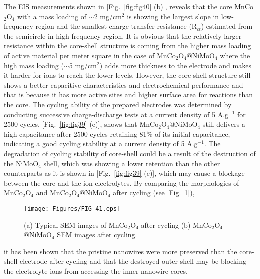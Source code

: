 \documentclass[reprint,amsmath,amssymb,aps,floatfix,
]{revtex4-2}
\begin{document}
The EIS measurements shown in [Fig.~\ref{fig:fig40} (b)], reveals that the core MnCo$_2$O$_4$ with a mass loading of $\sim$2 mg/cm$^2$ is showing the largest slope in low-frequency region and the smallest charge transfer resistance (R$_{ct}$) estimated from the semicircle in high-frequency region. It is obvious that the relatively larger resistance within the core-shell structure is coming from the higher mass loading of active material per meter square in the case of MnCo$_2$O$_4$@NiMoO$_4$ where the high mass loading ($\sim$5 mg/cm$^2$) adds more thickness to the electrode and makes it harder for ions to reach the lower levels. However, the core-shell structure still shows a better capacitive characteristics and electrochemical performance and that is because it has more active sites and higher surface area for reactions than the core. The cycling ability of the prepared electrodes was determined by conducting successive charge-discharge tests at a current density of 5 A.g$^{-1}$ for 2500 cycles. [Fig.~\ref{fig:fig39} (e)], shows that MnCo$_2$O$_4$@NiMoO$_4$ still delivers a high capacitance after 2500 cycles retaining 81\% of its initial capacitance, indicating a good cycling stability at a current density of  5 A.g$^{-1}$. The degradation of cycling stability of core-shell could be a result of the destruction of the NiMoO$_4$ shell, which was showing a lower retention than the other counterparts as it is shown in [Fig.~\ref{fig:fig39} (e)], which may cause a blockage between the core and the ion electrolytes. By comparing the morphologies of MnCo$_2$O$_4$ and MnCo$_2$O$_4$@NiMoO$_4$ after cycling (see [Fig.~\ref{fig:fig41}]),
\begin{figure}[b]
    \centering
    \texttt{[image: Figures/FIG-41.eps]}
    \caption{\label{fig:fig41}(a) Typical SEM images of MnCo$_2$O$_4$ after cycling (b) MnCo$_2$O$_4$@NiMoO$_4$ SEM images after cycling.}
    \end{figure}
it has been shown that the pristine nanowires were more preserved than the core-shell electrode after cycling and that the destroyed outer shell may be blocking the electrolyte ions from accessing the inner nanowire cores.
\end{document}
